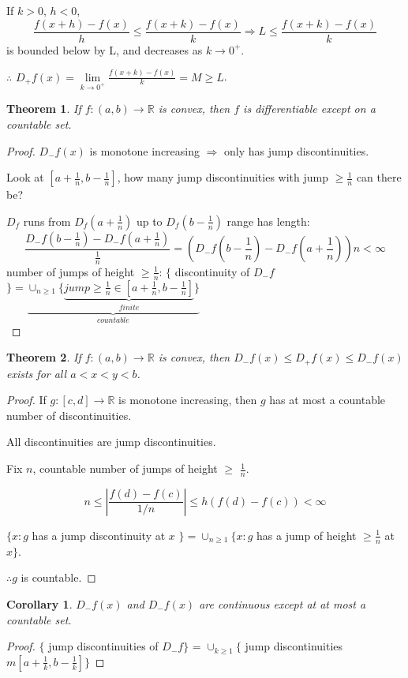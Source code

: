 \documentclass[12pt]{article}
\newcommand{\abs}[1]{\left| #1 \right|}
\theoremstyle{plain}
\newtheorem{theorem}{Theorem}[subsection]
\newtheorem{corollary}{Corollary}[subsection]
\newcommand{\dlim}{\displaystyle\lim\limits}
\begin{document}
		If $k>0$, $h< 0$, 
		\[\frac{f(x+h)-f(x)}h \leq \frac{f(x+k)-f(x)}k 
		\Rightarrow L \leq \frac{f(x+k)-f(x)}k\]
		is bounded below by L, 
		and decreases as $k \to 0^+$. 

		$\therefore$ 
		$D_+f(x) = \dlim_{k\to 0^+} \frac{f(x+k)-f(x)}k = M \geq L$.\\ 

		\begin{theorem}
			If $f:(a,b)\to\mathbb{R}$ is convex, then $f$ is differentiable 
			except on a countable set. 
		\end{theorem}
		\begin{proof}
			$D_-f(x)$ is monotone increasing $\Rightarrow$ only
			has jump discontinuities. 

		Look at $[a+\frac1n, b-\frac1n]$, how many jump discontinuities with jump
		$\geq \frac1n$ can there be? 

		$D_f$ runs from $D_f(a+\frac1n)$ up to $D_f(b-\frac1n)$ range has length:
		\[
			\dfrac{D_-f(b-\frac1n)-D_-f(a+\frac1n)}{\frac1n} = 
			(D_-f(b-\frac1n)-D_-f(a+\frac1n))n < \infty
		\]
		number of jumps of height $\geq \frac1n$: 
		$\{$ discontinuity of $D_-f$ $\} = \underbrace{\cup _{n\geq 1} \{
		\underbrace{jump \geq \frac1n \in [a+\frac1n, b-\frac1n]}_{finite} 
		\}}_{countable}$\\  
		\end{proof}
		

		\begin{theorem}
			If $f:(a,b)\to\mathbb{R}$ is convex, then $D_-f(x) \leq D_+f(x) 
			\leq D_-f(x)$ exists for all $a < x < y < b$.
		\end{theorem}
		\begin{proof}
			If $g:[c,d]\to\mathbb{R}$ is monotone increasing, 
			then $g$ has at most a countable number of discontinuities. 

			All discontinuities are jump discontinuities. 

			Fix $n$, countable number of jumps of height $\geq $ $\frac1n$. 

			\[n \leq \abs{\frac{f(d)-f(c)}{1/n}}\leq h(f(d)-f(c))<\infty\]

			$\{x : g$ has a jump discontinuity at $x$ $\}
			= \cup_{n\geq 1} \{x : g$ has a jump of height $\geq \frac1n$ at $x \}$.

			$\therefore g$ is countable. 
		\end{proof}

		\vspace{0.1 in}

		\begin{corollary}
			$D_-f(x)$ and $D_-f(x)$ are continuous except 
			at at most a countable set. 
		\end{corollary}
		\begin{proof}
			$\{$ jump discontinuities of $D_-f$$\}$ = 
			$\cup_{k\geq 1}\{$ jump discontinuities $m [a + \frac1k, b-\frac1k]$$\}$
		\end{proof}
\end{document}
